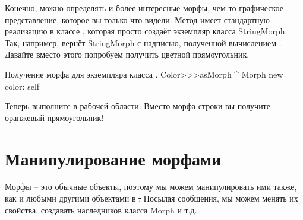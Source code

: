 \documentclass[a4paper,10pt,twoside]{book}
\begin{document}
Конечно, можно определять и более интересные морфы, чем то графическое представление, которое вы только что видели.
Метод  имеет стандартную реализацию в классе , которая просто создаёт экземпляр класса StringMorph.
Так, например,  вернёт StringMorph с надписью, полученной вычислением  .
Давайте вместо этого попробуем получить цветной прямоугольник.

\begin{method}{Получение морфа для экземпляра класса .}
Color>>>asMorph
	^ Morph new color: self
\end{method}
\noindent
Теперь выполните   в рабочей области. Вместо морфа-строки вы получите оранжевый прямоугольник!


\section{Манипулирование морфами}

Морфы -- это обычные объекты, поэтому мы можем манипулировать ими также, как и любыми другими объектами в \st. Посылая сообщения, мы можем менять их свойства, создавать наследников класса Morph и т.д.
\end{document}
